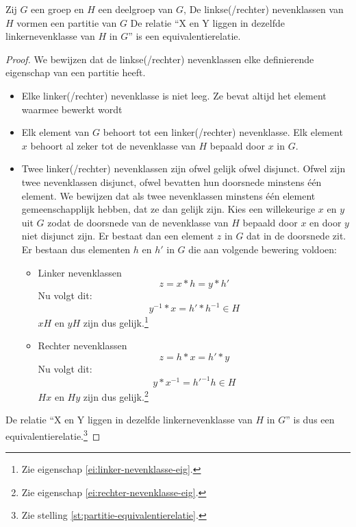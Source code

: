 \documentclass[main.tex]{subfiles}
\begin{document}
\begin{st}
  Zij $G$ een groep en $H$ een deelgroep van $G$, De linkse(/rechter) nevenklassen van $H$ vormen een partitie van $G$
  De relatie ``X en Y liggen in dezelfde linkernevenklasse van $H$ in $G$'' is een equivalentierelatie.

  \begin{proof}
    We bewijzen dat de linkse(/rechter) nevenklassen elke definierende eigenschap van een partitie heeft.
    \begin{itemize}
    \item Elke linker(/rechter) nevenklasse is niet leeg. Ze bevat altijd het element waarmee bewerkt wordt
    \item Elk element van $G$ behoort tot een linker(/rechter) nevenklasse.
      Elk element $x$ behoort al zeker tot de nevenklasse van $H$ bepaald door $x$ in $G$.
    \item Twee linker(/rechter) nevenklassen zijn ofwel gelijk ofwel disjunct.
      Ofwel zijn twee nevenklassen disjunct, ofwel bevatten hun doorsnede minstens \'e\'en element.
      We bewijzen dat als twee nevenklassen minstens \'e\'en element gemeenschapplijk hebben, dat ze dan gelijk zijn.
      Kies een willekeurige $x$ en $y$ uit $G$ zodat de doorsnede van de nevenklasse van $H$ bepaald door $x$ en door $y$ niet disjunct zijn.
      Er bestaat dan een element $z$ in $G$ dat in de doorsnede zit.
      Er bestaan dus elementen $h$ en $h'$ in $G$ die aan volgende bewering voldoen:
      \begin{itemize}
      \item Linker nevenklassen
        \[ z = x*h = y*h' \]
        Nu volgt dit:
        \[ y^{-1}*x = h'*h^{-1} \in H \]
        $xH$ en $yH$ zijn dus gelijk.\footnote{Zie eigenschap \ref{ei:linker-nevenklasse-eig}.}
      \item Rechter nevenklassen
        \[ z = h*x = h'*y \]
        Nu volgt dit:
        \[ y*x^{-1} = h'^{-1}h \in H \]
        $Hx$ en $Hy$ zijn dus gelijk.\footnote{Zie eigenschap \ref{ei:rechter-nevenklasse-eig}.}
      \end{itemize}
    \end{itemize}
    De relatie ``X en Y liggen in dezelfde linkernevenklasse van $H$ in $G$'' is dus een equivalentierelatie.\footnote{Zie stelling \ref{st:partitie-equivalentierelatie}.}
  \end{proof}
\end{st}
\end{document}
